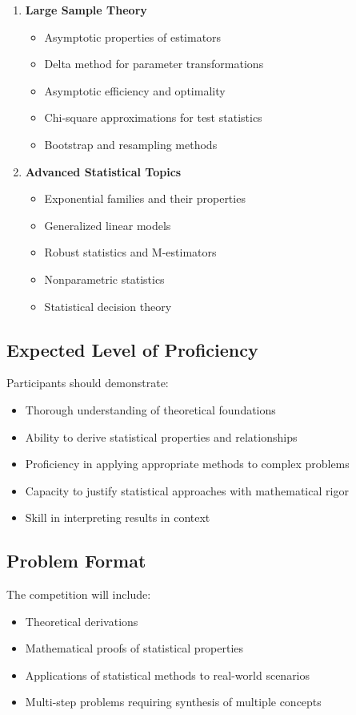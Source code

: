 \documentclass[12pt,a4paper]{article}
\theoremstyle{remark}
\begin{document}
\begin{enumerate}
\item \textbf{Large Sample Theory}
   \begin{itemize}
   \item Asymptotic properties of estimators
   \item Delta method for parameter transformations
   \item Asymptotic efficiency and optimality
   \item Chi-square approximations for test statistics
   \item Bootstrap and resampling methods
   \end{itemize}

\item \textbf{Advanced Statistical Topics}
   \begin{itemize}
   \item Exponential families and their properties
   \item Generalized linear models
   \item Robust statistics and M-estimators
   \item Nonparametric statistics
   \item Statistical decision theory
   \end{itemize}
\end{enumerate}

\subsection*{Expected Level of Proficiency}

Participants should demonstrate:
\begin{itemize}
\item Thorough understanding of theoretical foundations
\item Ability to derive statistical properties and relationships
\item Proficiency in applying appropriate methods to complex problems
\item Capacity to justify statistical approaches with mathematical rigor
\item Skill in interpreting results in context
\end{itemize}

\subsection*{Problem Format}

The competition will include:
\begin{itemize}
\item Theoretical derivations
\item Mathematical proofs of statistical properties
\item Applications of statistical methods to real-world scenarios
\item Multi-step problems requiring synthesis of multiple concepts
\end{itemize}
\end{document}
